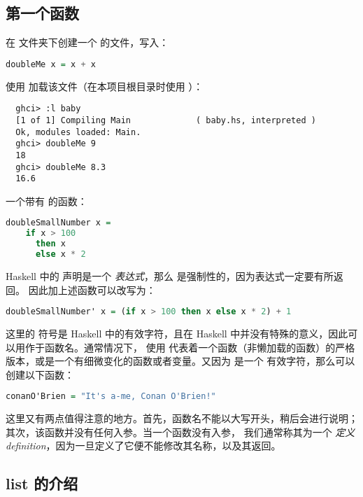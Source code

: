 \documentclass[./main.tex]{subfiles}
\begin{document}
\subsection*{第一个函数}

在  文件夹下创建一个  的文件，写入：

\begin{lstlisting}[language=Haskell]
  doubleMe x = x + x
\end{lstlisting}

使用  加载该文件（在本项目根目录时使用 ）：

\begin{lstlisting}
  ghci> :l baby
  [1 of 1] Compiling Main             ( baby.hs, interpreted )
  Ok, modules loaded: Main.
  ghci> doubleMe 9
  18
  ghci> doubleMe 8.3
  16.6
\end{lstlisting}

一个带有  的函数：

\begin{lstlisting}[language=Haskell]
  doubleSmallNumber x =
    if x > 100
      then x
      else x * 2
\end{lstlisting}

Haskell 中的  声明是一个 \textit{表达式}，那么  是强制性的，因为表达式一定要有所返回。
因此加上述函数可以改写为：

\begin{lstlisting}[language=Haskell]
  doubleSmallNumber' x = (if x > 100 then x else x * 2) + 1
\end{lstlisting}

这里的  符号是 Haskell 中的有效字符，且在 Haskell 中并没有特殊的意义，因此可以用作于函数名。通常情况下，
使用  代表着一个函数（非懒加载的函数）的严格版本，或是一个有细微变化的函数或者变量。又因为  是一个
有效字符，那么可以创建以下函数：

\begin{lstlisting}[language=Haskell]
  conanO'Brien = "It's a-me, Conan O'Brien!"
\end{lstlisting}

这里又有两点值得注意的地方。首先，函数名不能以大写开头，稍后会进行说明；其次，该函数并没有任何入参。当一个函数没有入参，
我们通常称其为一个 \textit{定义 definition}，因为一旦定义了它便不能修改其名称，以及其返回。

\subsection*{list 的介绍}
\end{document}

